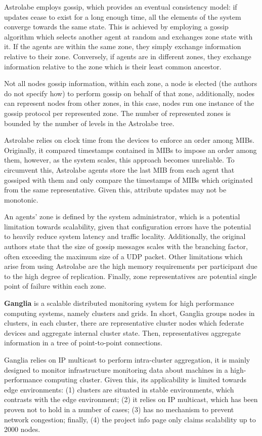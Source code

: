 Astrolabe employs gossip, which provides an eventual consistency model: if updates cease to exist for a long enough time, all the elements of the system  converge towards the same state. This is achieved by employing a gossip algorithm which selects another agent at random and exchanges zone state with it. If the agents are within the same zone, they simply exchange information relative to their zone. Conversely, if agents are in different zones, they exchange information relative to the zone which is their least common ancestor.

Not all nodes gossip information, within each zone, a node is elected (the authors do not specify how) to perform gossip on behalf of that zone, additionally, nodes can represent nodes from other zones, in this case, nodes run one instance of the gossip protocol per represented zone. The number of represented zones is bounded by the number of levels in the Astrolabe tree.

Astrolabe relies on clock time from the devices to enforce an order among MIBs. Originally, it compared timestamps contained in MIBs to impose an order among them, however, as the system scales, this approach becomes unreliable. To circumvent this, Astrolabe agents store the last MIB from each agent that gossiped with them and only compare the timestamps of MIBs which originated from the same representative. Given this, attribute updates may not be monotonic.

An agents' zone is defined by the system administrator, which is a potential limitation towards scalability, given that configuration errors have the potential to heavily reduce system latency and traffic locality. Additionally, the original authors state that the size of gossip messages scales with the branching factor, often exceeding the maximum size of a UDP packet. Other limitations which arise from using Astrolabe are the high memory requirements per participant due to the high degree of replication. Finally, zone representatives are potential single point of failure within each zone. 

\textbf{Ganglia} \cite{massie2004ganglia} is a scalable distributed monitoring system for high performance computing systems, namely clusters and grids. In short, Ganglia groups nodes in clusters, in each cluster, there are representative cluster nodes which federate devices and aggregate internal cluster state. Then, representatives aggregate information in a tree of point-to-point connections.

Ganglia relies on IP multicast to perform intra-cluster aggregation, it is mainly designed to monitor infrastructure monitoring data about machines in a high-performance computing cluster. Given this, its applicability is limited towards edge environments: (1) clusters are situated in stable environments, which contrasts with the edge environment; (2) it relies on IP multicast, which has been proven not to hold in a number of cases; (3) has no mechanism to prevent network congestion; finally, (4) the project info page only claims scalability up to 2000 nodes.

